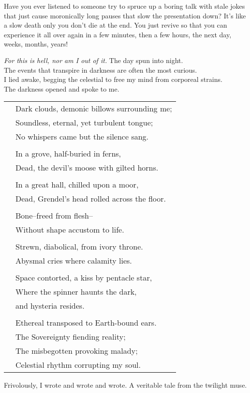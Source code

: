 Have you ever listened to someone try to spruce up
a boring talk with stale jokes that just cause
moronically long pauses that slow the presentation
down?  It's like a slow death only you don't die at
the end.  You just revive so that you can experience
it all over again in a few minutes, then a few hours,
the next day, \large{}weeks, \Large{}months, \LARGE{}years!\normalsize
\VV


\textit{For this is hell, nor am I out of it.}
\lhoarb
\noindent
The day spun into night. \\
The events that transpire in darkness are often the most curious. \\
I lied awake, begging the celestial to free my mind from corporeal strains. \\
The darkness opened and spoke to me.
\vv

\singlespace
\begin{tabular}{ll}
& Dark clouds, demonic billows surrounding me; \\
& Soundless, eternal, yet turbulent tongue; \\
& No whispers came but the silence sang. \\
&\\
& In a grove, half-buried in ferns, \\
& Dead, the devil's moose with gilted horns. \\
&\\
& In a great hall, chilled upon a moor, \\
& Dead, Grendel's head rolled across the floor. \\
&\\
& Bone--freed from flesh-- \\
& Without shape accustom to life. \\
&\\
& Strewn, diabolical, from ivory throne. \\
& Abysmal cries where calamity lies. \\
&\\
& Space contorted, a kiss by pentacle star, \\
& Where the spinner haunts the dark, \\
& and hysteria resides. \\
&\\
& Ethereal transposed to Earth-bound ears. \\
& The Sovereignty fiending reality; \\
& The misbegotten provoking malady; \\
& Celestial rhythm corrupting my soul. \\
\end{tabular}
\revertspace\VV


\noindent
Frivolously, I wrote and wrote and wrote.
A veritable tale from the twilight muse.
%
%
